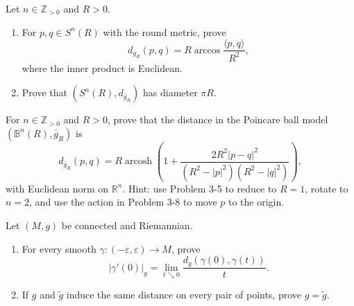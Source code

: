 \begin{exercise}
\label{prob:round-metric-distance-sphere}

Let $n\in\mathbb Z_{>0}$ and $R>0$.
\begin{enumerate}
\item[(a)] For $p,q\in S^n(R)$ with the round metric, prove
\[
d_{\bar g_R}(p,q)=R\arccos\frac{\langle p,q\rangle}{R^2},
\]
where the inner product is Euclidean.
\item[(b)] Prove that $(S^n(R),d_{\bar g_R})$ has diameter $\pi R$.
\end{enumerate}
\end{exercise}

\begin{exercise}
\label{prob:poincare-ball-distance-formula}

For $n\in\mathbb Z_{>0}$ and $R>0$, prove that the distance in the Poincare
ball model $(\mathbb B^n(R),\bar g_R)$ is
\[
d_{\bar g_R}(p,q)=R\operatorname{arcosh}\left(1+
\frac{2R^2|p-q|^2}{(R^2-|p|^2)(R^2-|q|^2)}\right),
\]
with Euclidean norm on $\mathbb R^n$.  Hint: use Problem 3-5 to reduce to
$R=1$, rotate to $n=2$, and use the action in Problem 3-8 to move $p$ to the
origin.
\end{exercise}

\begin{exercise}
\label{prob:distance-determines-metric}

Let $(M,g)$ be connected and Riemannian.
\begin{enumerate}
\item[(a)] For every smooth $\gamma:(-\varepsilon,\varepsilon)\to M$, prove
\[
|\gamma'(0)|_g=\lim_{t\searrow0}\frac{d_g(\gamma(0),\gamma(t))}{t}.
\]
\item[(b)] If $g$ and $\widetilde g$ induce the same distance on every pair of
points, prove $g=\widetilde g$.
\end{enumerate}
\end{exercise}

